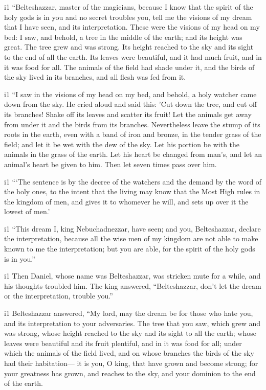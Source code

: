 i1 ``Belteshazzar, master of the magicians, because I know
that the spirit of the holy gods is in you and no secret troubles you,
tell me the visions of my dream that I have seen, and its
interpretation.  These were the visions of my head on my
bed: I saw, and behold, a tree in the middle of the earth; and its
height was great.  The tree grew and was strong. Its
height reached to the sky and its sight to the end of all the earth.
 Its leaves were beautiful, and it had much fruit, and in
it was food for all. The animals of the field had shade under it, and
the birds of the sky lived in its branches, and all flesh was fed from
it.

i1 ``I saw in the visions of my head on my bed, and
behold, a holy watcher came down from the sky.  He cried
aloud and said this: 'Cut down the tree, and cut off its branches! Shake
off its leaves and scatter its fruit! Let the animals get away from
under it and the birds from its branches.  Nevertheless
leave the stump of its roots in the earth, even with a band of iron and
bronze, in the tender grass of the field; and let it be wet with the dew
of the sky. Let his portion be with the animals in the grass of the
earth.  Let his heart be changed from man's, and let an
animal's heart be given to him. Then let seven times pass over him.

i1 ```The sentence is by the decree of the watchers and
the demand by the word of the holy ones, to the intent that the living
may know that the Most High rules in the kingdom of men, and gives it to
whomever he will, and sets up over it the lowest of men.'

i1 ``This dream I, king Nebuchadnezzar, have seen; and
you, Belteshazzar, declare the interpretation, because all the wise men
of my kingdom are not able to make known to me the interpretation; but
you are able, for the spirit of the holy gods is in you.''

i1 Then Daniel, whose name was Belteshazzar, was stricken
mute for a while, and his thoughts troubled him. The king answered,
``Belteshazzar, don't let the dream or the interpretation, trouble
you.''

i1 Belteshazzar answered, ``My lord, may the dream be for those who hate
you, and its interpretation to your adversaries.  The
tree that you saw, which grew and was strong, whose height reached to
the sky and its sight to all the earth;  whose leaves
were beautiful and its fruit plentiful, and in it was food for all;
under which the animals of the field lived, and on whose branches the
birds of the sky had their habitation---  it is you, O
king, that have grown and become strong; for your greatness has grown,
and reaches to the sky, and your dominion to the end of the earth.

